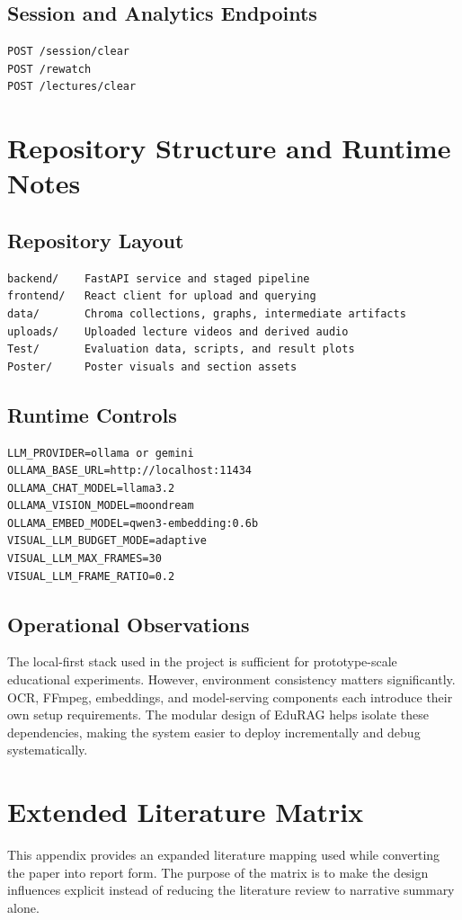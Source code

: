 \documentclass[12pt,a4paper,oneside]{report}
\begin{document}
\section*{Session and Analytics Endpoints}
\begin{verbatim}
POST /session/clear
POST /rewatch
POST /lectures/clear
\end{verbatim}

\chapter{Repository Structure and Runtime Notes}
\section*{Repository Layout}
\begin{verbatim}
backend/    FastAPI service and staged pipeline
frontend/   React client for upload and querying
data/       Chroma collections, graphs, intermediate artifacts
uploads/    Uploaded lecture videos and derived audio
Test/       Evaluation data, scripts, and result plots
Poster/     Poster visuals and section assets
\end{verbatim}

\section*{Runtime Controls}
\begin{verbatim}
LLM_PROVIDER=ollama or gemini
OLLAMA_BASE_URL=http://localhost:11434
OLLAMA_CHAT_MODEL=llama3.2
OLLAMA_VISION_MODEL=moondream
OLLAMA_EMBED_MODEL=qwen3-embedding:0.6b
VISUAL_LLM_BUDGET_MODE=adaptive
VISUAL_LLM_MAX_FRAMES=30
VISUAL_LLM_FRAME_RATIO=0.2
\end{verbatim}

\section*{Operational Observations}
The local-first stack used in the project is sufficient for prototype-scale educational experiments. However, environment consistency matters significantly. OCR, FFmpeg, embeddings, and model-serving components each introduce their own setup requirements. The modular design of EduRAG helps isolate these dependencies, making the system easier to deploy incrementally and debug systematically.

\chapter{Extended Literature Matrix}
This appendix provides an expanded literature mapping used while converting the paper into report form. The purpose of the matrix is to make the design influences explicit instead of reducing the literature review to narrative summary alone.
\end{document}

